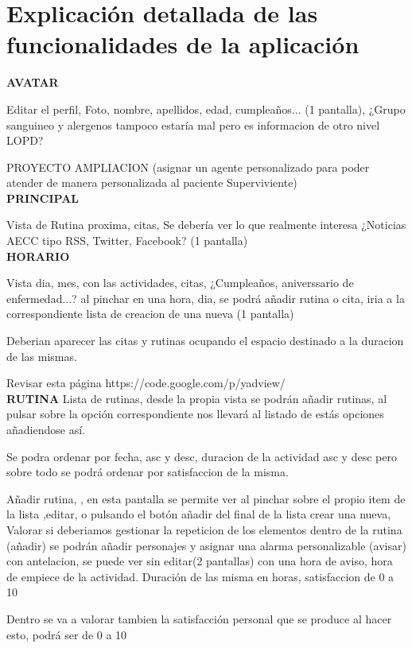 \documentclass[../pfc.tex]{subfiles}
\begin{document}
	\section{Explicación detallada de las funcionalidades de la aplicación}


	\textbf{AVATAR}
	
	Editar el perfil, Foto, nombre, apellidos, edad, cumpleaños... (1 pantalla), ¿Grupo sanguineo y alergenos tampoco estaría mal pero es informacion de otro nivel LOPD?
	
	PROYECTO AMPLIACION (asignar un agente personalizado para poder atender de manera personalizada al paciente Superviviente)\\
	

	\textbf{PRINCIPAL}
	
	Vista de Rutina proxima, citas, Se debería ver lo que realmente interesa ¿Noticias AECC tipo RSS, Twitter, Facebook? (1 pantalla)\\
	

	\textbf{HORARIO}
	
	Vista dia, mes, con las actividades, citas, ¿Cumpleaños, aniverssario de enfermedad...?  
	al pinchar en una hora, dia, se podrá añadir rutina o cita, iria a la correspondiente lista de creacion de una nueva (1 pantalla)
	
	Deberian aparecer las citas y rutinas ocupando el espacio destinado a la duracion de las mismas.
	
	Revisar esta página
	https://code.google.com/p/yadview/\\
	

	\textbf{RUTINA}
	Lista de rutinas, desde la propia vista se podrán añadir rutinas, al pulsar sobre la opción correspondiente nos llevará al listado de estás opciones añadiendose así.
	
	Se podra ordenar por fecha, asc y desc, duracion de la actividad asc y desc pero sobre todo se podrá ordenar por satisfaccion de la misma.
	
	Añadir rutina, , en esta pantalla se permite ver al pinchar sobre el propio item de la lista ,editar, o pulsando el botón añadir del final de la lista crear una nueva,
	Valorar si deberiamos gestionar la repeticion de los elementos					
	dentro de la rutina (añadir) se podrán añadir personajes y asignar una alarma personalizable (avisar) con antelacion, se puede ver sin editar(2 pantallas)
	con una hora de aviso, hora de empiece de la actividad. Duración de las misma en horas, satisfaccion de 0 a 10
	
	Dentro se va a valorar tambien la satisfacción personal que se produce al hacer esto, podrá ser de 0 a 10
	
\end{document}
